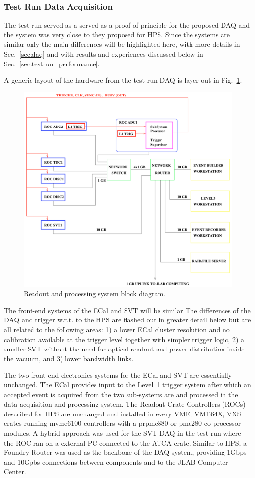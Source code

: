 
\subsubsection{Test Run Data Acquisition}
\label{sec:testrun_daq}
The test run served as a  served as a proof of principle for the proposed DAQ and the system was very 
close to they proposed for HPS. Since the systems are similar only the main differences will be highlighted here,  with more details in Sec.~\ref{sec:daq} and with results and experiences discussed below in Sec.~\ref{sec:testrun_performance}. 


A generic layout of the hardware from the test run DAQ is layer out in Fig.~\ref{fig:daq}.
 \begin{figure}[h]
\includegraphics[scale=0.35]{test2012/daq/daq_schem.pdf}
\caption{\small{Readout and processing system block diagram.}}\label{fig:daq}
\end{figure}
The front-end systems of the ECal and SVT will be similar 
The differences of the DAQ and trigger w.r.t. to the HPS are flashed out in greater detail below but 
are all related to the following areas:
1) a lower ECal cluster resolution and no calibration available at the trigger level together with simpler trigger logic, 
2) a smaller SVT without the need for optical readout and power distribution inside the vacuum,
and 3) lower bandwidth links.

The two front-end electronics systems for the ECal and SVT are essentially unchanged. The ECal provides 
input to the Level~1 trigger system after which an accepted event is acquired from the two sub-systems are
and processed in the data acquisition and processing system. The Readout Crate Controllers (ROCs)
 described for HPS are unchanged and installed in every VME, VME64X, VXS crates running 
 mvme6100 controllers with a prpmc880 or pmc280 co-processor modules. A hybrid approach was 
 used for the SVT DAQ in the test run where the ROC ran on a external PC connected to the ATCA crate. 
 Similar to HPS, a Foundry Router was used as the backbone of the DAQ system, providing 1Gbps and 
 10Gpbs connections between components and to the JLAB Computer Center.

